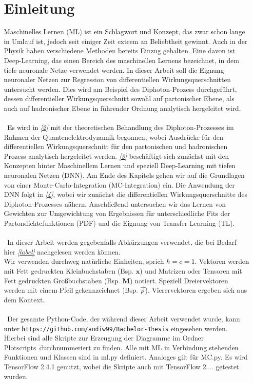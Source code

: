 \chapter{Einleitung}
Maschinelles Lernen (ML) ist ein Schlagwort und Konzept, das zwar schon lange in Umlauf ist, jedoch seit einiger Zeit extrem an Beliebtheit gewinnt. Auch in der Physik haben verschiedene Methoden bereits Einzug gehalten. Eine davon ist Deep-Learning, das einen Bereich des maschinellen Lernens bezeichnet, in dem tiefe neuronale Netze verwendet werden. In dieser Arbeit soll die Eignung neuronaler Netzen zur Regression von differentiellen Wirkungsquerschnitten untersucht werden. Dies wird am Beispiel des Diphoton-Prozess durchgeführt, dessen differentieller Wirkungsquerschnitt sowohl auf partonischer Ebene, als auch auf hadronischer Ebene in führender Ordnung analytisch hergeleitet wird.\\
\\\
Es wird in \textit{\autoref{2}} mit der theoretischen Behandlung des Diphoton-Prozesses im Rahmen der Quantenelektrodynamik begonnen, wobei Ausdrücke für den differentiellen Wirkungsquerschnitt für den partonischen und hadronischen Prozess analytisch hergeleitet werden. \textit{\autoref{3}} beschäftigt sich zunächst mit den Konzepten hinter Maschinellem Lernen und speziell Deep-Learning mit tiefen neuronalen Netzen (DNN). Am Ende des Kapitels gehen wir auf die Grundlagen von einer Monte-Carlo-Integration (MC-Integration) ein. Die Anwendung der DNN folgt in \textit{\autoref{4}}, wobei wir zunächst die differentiellen Wirkungsquerschnitte des Diphoton-Prozesses nähern. Anschließend untersuchen wir das Lernen von Gewichten zur Umgewichtung von Ergebnissen für unterschiedliche Fits der Partondichtefunktionen (PDF) und die Eignung von Transfer-Learning (TL). \\
\\\
In dieser Arbeit werden gegebenfalls Abkürzungen verwendet, die bei Bedarf hier \textit{\autoref{label}} nachgelesen werden können. \\
Wir verwenden durchweg natürliche Einheiten, sprich $\hbar = c = 1$. Vektoren werden mit Fett gedruckten Kleinbuchstaben (Bsp. $\mathbf{x}$) und Matrizen oder Tensoren mit Fett gedruckten Großbuchstaben (Bsp. $\mathbf{M}$) notiert. Speziell Dreiervektoren werden mit einem Pfeil gekennzeichnet (Bsp. $\vec{p}$). Vierervektoren ergeben sich aus dem Kontext. \\
\\\
Der gesamte Python-Code, der während dieser Arbeit verwendet wurde, kann unter \texttt{https://github.com/andiw99/Bachelor-Thesis} eingesehen werden. Hierbei sind alle Skripte zur Erzeugung der Diagramme im Ordner \glqq Plotscripts\grqq~durchnummeriert zu finden. Alle mit ML in Verbindung stehenden Funktionen und Klassen sind in ml.py definiert. Analoges gilt für MC.py. Es wird TensorFlow 2.4.1 genutzt, wobei die Skripte auch mit TensorFlow 2.... getestet wurden.

